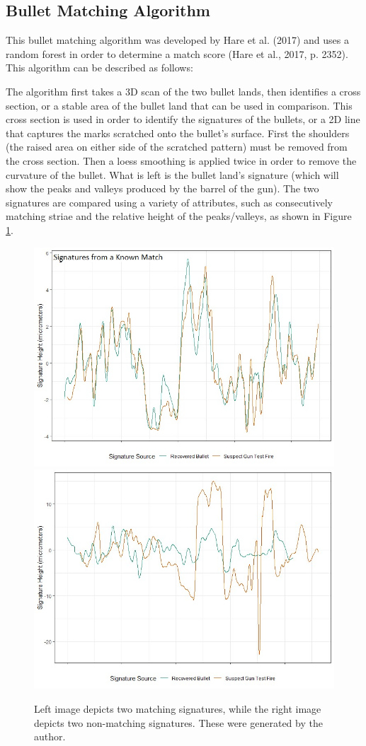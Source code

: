 \documentclass[print]{nuthesis}
\begin{document}
\hypertarget{bullet-matching-algorithm}{%
\subsection{Bullet Matching Algorithm}\label{bullet-matching-algorithm}}

This bullet matching algorithm was developed by Hare et al. (2017) and uses a random forest in order to determine a match score (Hare et al., 2017, p. 2352).
This algorithm can be described as follows:

The algorithm first takes a 3D scan of the two bullet lands, then identifies a cross section, or a stable area of the bullet land that can be used in comparison.
This cross section is used in order to identify the signatures of the bullets, or a 2D line that captures the marks scratched onto the bullet's surface.
First the shoulders (the raised area on either side of the scratched pattern) must be removed from the cross section.
Then a loess smoothing is applied twice in order to remove the curvature of the bullet.
What is left is the bullet land's signature (which will show the peaks and valleys produced by the barrel of the gun).
The two signatures are compared using a variety of attributes, such as consecutively matching striae and the relative height of the peaks/valleys, as shown in Figure \ref{fig:signaturecompare}.

\begin{figure}

{\centering \includegraphics[width=0.49\linewidth]{images/Match_Signatures} \includegraphics[width=0.49\linewidth]{images/K995_NoMatch_Signatures} 

}

\caption{Left image depicts two matching signatures, while the right image depicts two non-matching signatures. These were generated by the author.}\label{fig:signaturecompare}
\end{figure}
\end{document}
